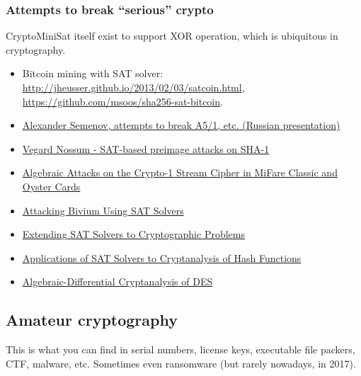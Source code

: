 \subsubsection{Attempts to break ``serious'' crypto}

CryptoMiniSat itself exist to support XOR operation, which is ubiquitous in cryptography.

\begin{itemize}
\item Bitcoin mining with SAT solver: \url{http://jheusser.github.io/2013/02/03/satcoin.html}, \url{https://github.com/msoos/sha256-sat-bitcoin}.

\item \href{http://2015.phdays.ru/program/dev/40400/}{Alexander Semenov, attempts to break A5/1, etc. (Russian presentation)}

\item \href{https://yurichev.com/mirrors/SAT_SMT_crypto/thesis-output.pdf}{Vegard Nossum - SAT-based preimage attacks on SHA-1}

\item \href{https://yurichev.com/mirrors/SAT_SMT_crypto/166.pdf}{Algebraic Attacks on the Crypto-1 Stream Cipher in MiFare Classic and Oyster Cards}

\item \href{https://yurichev.com/mirrors/SAT_SMT_crypto/Attacking-Bivium-Using-SAT-Solvers.pdf}{Attacking Bivium Using SAT Solvers}

\item \href{https://yurichev.com/mirrors/SAT_SMT_crypto/Extending_SAT_2009.pdf}{Extending SAT Solvers to Cryptographic Problems}

\item \href{https://yurichev.com/mirrors/SAT_SMT_crypto/sat-hash.pdf}{Applications of SAT Solvers to Cryptanalysis of Hash Functions}

\item \href{https://yurichev.com/mirrors/SAT_SMT_crypto/slidesC2DES.pdf}{Algebraic-Differential Cryptanalysis of DES}

\end{itemize}

\subsection{Amateur cryptography}

This is what you can find in serial numbers, license keys, executable file packers, \ac{CTF}, malware, etc.
Sometimes even ransomware (but rarely nowadays, in 2017).

